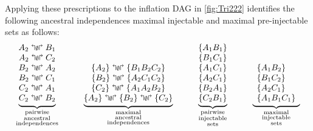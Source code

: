Applying these prescriptions to the inflation DAG in \cref{fig:Tri222} identifies the following 
 ancestral independences 
maximal injectable and maximal pre-injectable sets as follows:
\begin{align}\label{eq:basicsetup222}
{\underbrace{\begin{matrix}
A_2\aindep B_1\\
A_2\aindep C_2\\
B_2\aindep A_2\\
B_2\aindep C_1\\
C_2\aindep A_1\\
C_2\aindep B_2
\end{matrix}}_{\substack{\text{pairwise}\\\text{ancestral}\\\text{independences}}}}
\qquad\quad
{\underbrace{\begin{matrix}
\\ \\
\brackets{A_2}\aindep \brackets{B_1 B_2 C_2}\\
\brackets{B_2}\aindep \brackets{A_2 C_1 C_2}\\
\brackets{C_2}\aindep \brackets{A_1 A_2 B_2}\\
\brackets{A_2}\aindep \brackets{B_2}\aindep \brackets{C_2}
\end{matrix}}_{\substack{\text{maximal}\\\text{ancestral}\\\text{independences}}}}
\qquad\quad
{\underbrace{\begin{matrix}
\brackets{ A_1 B_1 }\\
\brackets{ B_1 C_1 }\\
\brackets{ A_1 C_1 }\\
\brackets{ A_2 C_1 }\\
\brackets{ B_2 A_1 }\\
\brackets{ C_2 B_1 }\\
\end{matrix}}_{\substack{\text{pairwise}\\\text{injectable}\\\text{sets}}}}
\qquad\quad
{\underbrace{\begin{array}{l}
\\ \\
\brackets{A_1 B_2}\\
\brackets{B_1 C_2}\\
\brackets{A_2 C_1}\\
\brackets{A_1 B_1 C_1}
\end{array}}_{\substack{\text{maximal}\\\text{injectable}\\\text{sets}}}}

\end{align}
